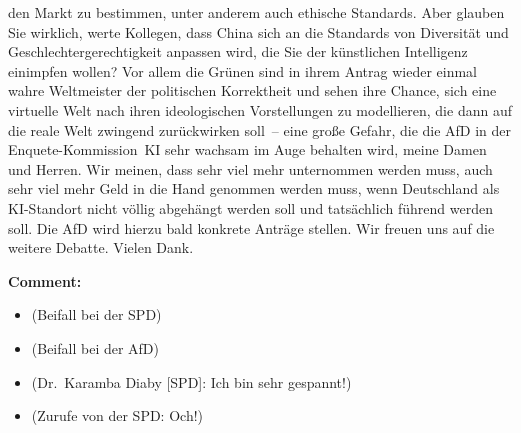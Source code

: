 \documentclass{article}
\begin{document}
den Markt zu bestimmen, unter anderem auch ethische Standards. Aber glauben Sie wirklich, werte Kollegen, dass China sich an die Standards von Diversität und Geschlechtergerechtigkeit anpassen wird, die Sie der künstlichen Intelligenz einimpfen wollen? Vor allem die Grünen sind in ihrem Antrag wieder einmal wahre Weltmeister der politischen Korrektheit und sehen ihre Chance, sich eine virtuelle Welt nach ihren ideologischen Vorstellungen zu modellieren, die dann auf die reale Welt zwingend zurückwirken soll – eine große Gefahr, die die AfD in der Enquete-­Kommission KI sehr wachsam im Auge behalten wird, meine Damen und Herren.  Wir meinen, dass sehr viel mehr unternommen werden muss, auch sehr viel mehr Geld in die Hand genommen werden muss, wenn Deutschland als KI-Standort nicht völlig abgehängt werden soll und tatsächlich führend werden soll.  Die AfD wird hierzu bald konkrete Anträge stellen. Wir freuen uns auf die weitere Debatte. Vielen Dank.  

\noindent\textbf{Comment:}
\begin{itemize}
    \setlength\itemsep{-3pt}
    \item (Beifall bei der SPD)
    \setlength\itemsep{-3pt}
    \item (Beifall bei der AfD)
    \setlength\itemsep{-3pt}
    \item (Dr. Karamba Diaby [SPD]: Ich bin sehr gespannt!)
    \setlength\itemsep{-3pt}
    \item (Zurufe von der SPD: Och!)
\end{itemize}
\end{document}
